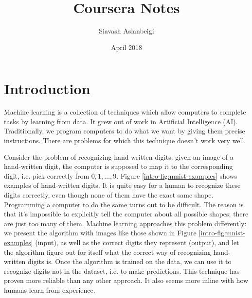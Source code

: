 \documentclass{article}
\title{Coursera Notes}
\author{Siavash Aslanbeigi}
\date{April 2018}
\theoremstyle{definition}
\begin{document}
\maketitle
\tableofcontents

\section{Introduction}
Machine learning is a collection of techniques which allow computers to complete tasks by learning from data. It grew out of work in Artificial Intelligence (AI). Traditionally, we program computers to do what we want by giving them precise instructions. There are problems for which this technique doesn't work very well. 

Consider the problem of recognizing hand-written digits: given an image of a hand-written digit, the computer is supposed to map it to the corresponding digit, i.e. pick correctly from $0,1,\dots,9$. Figure \ref{intro-fig:mnist-examples} shows examples of hand-written digits. It is quite easy for a human to recognize these digits correctly, even though none of them have the exact same shape. Programming a computer to do the same turns out to be difficult. The reason is that it's impossible to explicitly tell the computer about all possible shapes; there are just too many of them. Machine learning approaches this problem differently: we present the algorithm with images like those shown in Figure \ref{intro-fig:mnist-examples} (input), as well as the correct digits they represent (output), and let the algorithm figure out for itself what the correct way of recognizing hand-written digits is. Once the algorithm is trained on the data, we can use it to recognize digits not in the dataset, i.e. to make predictions. This technique has proven more reliable than any other approach. It also seems more inline with how humans learn from experience.
\end{document}
